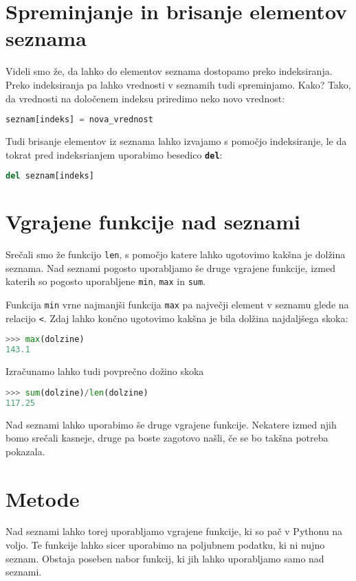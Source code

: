 \section{Spreminjanje in brisanje elementov seznama}

Videli smo že, da lahko do elementov seznama dostopamo preko indeksiranja. Preko indeksiranja pa lahko vrednosti v seznamih tudi spreminjamo. Kako? Tako, da vrednosti na določenem indeksu priredimo neko novo vrednost:
\begin{lstlisting}[language=Python]
seznam[indeks] = nova_vrednost
\end{lstlisting}

Tudi brisanje elementov iz seznama lahko izvajamo s pomočjo indeksiranje, le da tokrat pred indeksrianjem uporabimo besedico \textbf{\texttt{del}}:
\begin{lstlisting}[language=Python]
del seznam[indeks]
\end{lstlisting}

\section{Vgrajene funkcije nad seznami}
Srečali smo že funkcijo \texttt{len}, s pomočjo katere lahko ugotovimo kakšna je dolžina seznama. Nad seznami pogosto uporabljamo še druge vgrajene funkcije, izmed katerih so pogosto uporabljene \texttt{min}, \texttt{max} in \texttt{sum}.

Funkcija \texttt{min} vrne najmanjši funkcija \texttt{max} pa največji element v seznamu glede na relacijo \texttt{<}. Zdaj lahko končno ugotovimo kakšna je bila dolžina najdaljšega skoka:
\begin{lstlisting}[language=Python]
>>> max(dolzine)
143.1
\end{lstlisting}

Izračunamo lahko tudi povprečno dožino skoka
\begin{lstlisting}[language=Python]
>>> sum(dolzine)/len(dolzine)
117.25
\end{lstlisting}
Nad seznami lahko uporabimo še druge vgrajene funkcije. Nekatere izmed njih bomo srečali kasneje, druge pa boste zagotovo našli, če se bo takšna potreba pokazala. 

\section{Metode}

Nad seznami lahko torej uporabljamo vgrajene funkcije, ki so pač v Pythonu na voljo. Te funkcije lahko sicer uporabimo na poljubnem podatku, ki ni nujno seznam. Obstaja poseben nabor funkcij, ki jih lahko uporabljamo samo nad seznami. 

